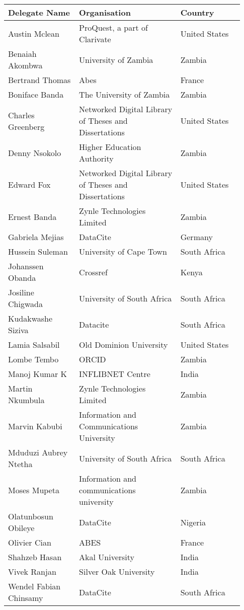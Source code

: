 
\begin{center}
\begin{longtable}{p{0.28\linewidth} p{0.4\linewidth} p{0.25\linewidth}}
\toprule
\textbf{Delegate Name} & \textbf{Organisation} & \textbf{Country} \\
\midrule
Austin Mclean & ProQuest, a part of Clarivate & United States \\  \hline
Benaiah Akombwa & University of Zambia & Zambia \\  \hline
Bertrand Thomas & Abes & France \\  \hline
Boniface Banda & The University of Zambia & Zambia \\  \hline
Charles Greenberg & Networked Digital Library of Theses and Dissertations & United States \\  \hline
Denny Nsokolo & Higher Education Authority & Zambia \\  \hline
Edward Fox & Networked Digital Library of Theses and Dissertations & United States \\  \hline
Ernest Banda & Zynle Technologies Limited & Zambia \\  \hline
Gabriela Mejias & DataCite & Germany \\  \hline
Hussein Suleman & University of Cape Town & South Africa \\  \hline
Johanssen Obanda & Crossref & Kenya \\  \hline
Josiline Chigwada & University of South Africa & South Africa \\  \hline
Kudakwashe Siziva & Datacite & South Africa \\  \hline
Lamia Salsabil & Old Dominion University & United States \\  \hline
Lombe Tembo & ORCID & Zambia \\  \hline
Manoj Kumar K & INFLIBNET Centre & India \\  \hline
Martin Nkumbula & Zynle Technologies Limited & Zambia \\  \hline
Marvin Kabubi & Information and Communications University & Zambia \\  \hline
Mduduzi Aubrey Ntetha & University of South Africa & South Africa \\  \hline
Moses Mupeta & Information and communications university & Zambia \\  \hline
Olatunbosun Obileye & DataCite & Nigeria \\  \hline
Olivier Cian & ABES & France \\  \hline
Shahzeb Hasan & Akal University & India \\  \hline
Vivek Ranjan & Silver Oak University & India \\  \hline
Wendel Fabian Chinsamy & DataCite & South Africa \\  \hline
\end{longtable}
\end{center}
